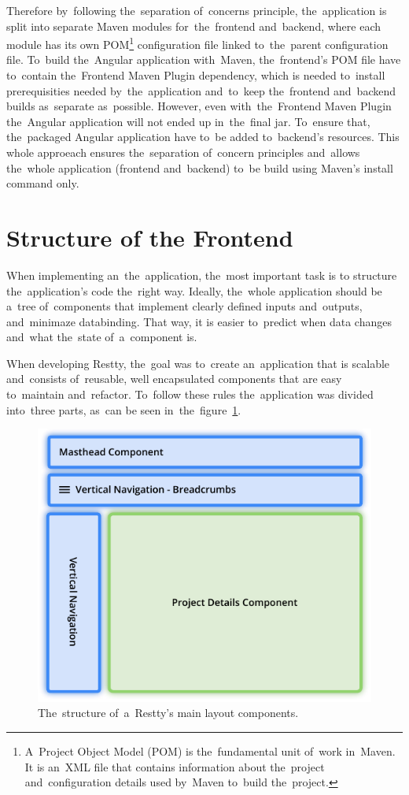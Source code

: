 Therefore by~following the~separation of~concerns principle, the~application is split into separate Maven modules for~the~frontend
and~backend, where each module has its own POM\footnote{A~Project Object Model (POM) is the~fundamental unit of~work in~Maven.
It is an~XML file that contains information about the~project and~configuration details used by~Maven to~build the~project.} configuration
file linked to~the~parent configuration file. To~build the~Angular application with~Maven, the~frontend's POM file have to~contain 
the~Frontend Maven Plugin dependency, which is needed to~install prerequisities needed by~the~application and~to~keep
the~frontend and~backend builds as~separate as~possible. However, even with~the~Frontend Maven Plugin the~Angular application will not
ended up in~the~final jar. To~ensure that, the~packaged Angular application have to~be added to~backend's resources. This whole approeach
ensures the~separation of~concern principles and~allows the~whole application (frontend and~backend) to~be build using Maven's install command only.



\section{Structure of the Frontend}
When implementing an~the~application, the~most important task is to structure the~application's code
the~right way. Ideally, the~whole application should be a~tree of~components that implement clearly
defined inputs and~outputs, and~minimaze  databinding. That way, it is easier to~predict
when data changes and~what the~state of~a~component is.

When developing Restty, the~goal was to~create an~application that is scalable and~consists
of~reusable, well encapsulated components that are easy to~maintain and~refactor. To~follow these
rules the~application was divided into~three parts, as~can be seen in~the~figure~\ref{fig-layout}.

\begin{figure}[!hbt]
	\centering
	\includegraphics[scale=0.7]{./figures/layout.pdf}
	\caption{The~structure of~a~Restty's main layout components.}
	\label{fig-layout}
\end{figure}

